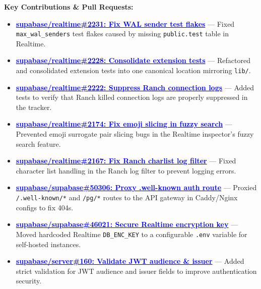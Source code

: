 \documentclass[letterpaper,10pt]{article}
\begin{document}
\vspace{4pt}
\noindent\textbf{Key Contributions \& Pull Requests:}
\begin{itemize}
  \item \href{https://github.com/supabase/realtime/pull/2231}{\textcolor{blue}{\textbf{supabase/realtime\#2231: Fix WAL sender test flakes}}} --- Fixed \texttt{max\_wal\_senders} test flakes caused by missing \texttt{public.test} table in Realtime.
  \item \href{https://github.com/supabase/realtime/pull/2228}{\textcolor{blue}{\textbf{supabase/realtime\#2228: Consolidate extension tests}}} --- Refactored and consolidated extension tests into one canonical location mirroring \texttt{lib/}.
  \item \href{https://github.com/supabase/realtime/pull/2222}{\textcolor{blue}{\textbf{supabase/realtime\#2222: Suppress Ranch connection logs}}} --- Added tests to verify that Ranch killed connection logs are properly suppressed in the tracker.
  \item \href{https://github.com/supabase/realtime/pull/2174}{\textcolor{blue}{\textbf{supabase/realtime\#2174: Fix emoji slicing in fuzzy search}}} --- Prevented emoji surrogate pair slicing bugs in the Realtime inspector's fuzzy search feature.
  \item \href{https://github.com/supabase/realtime/pull/2167}{\textcolor{blue}{\textbf{supabase/realtime\#2167: Fix Ranch charlist log filter}}} --- Fixed character list handling in the Ranch log filter to prevent logging errors.
  \item \href{https://github.com/supabase/supabase/pull/50306}{\textcolor{blue}{\textbf{supabase/supabase\#50306: Proxy .well-known auth route}}} --- Proxied \texttt{/.well-known/*} and \texttt{/pg/*} routes to the API gateway in Caddy/Nginx configs to fix 404s.
  \item \href{https://github.com/supabase/supabase/pull/46021}{\textcolor{blue}{\textbf{supabase/supabase\#46021: Secure Realtime encryption key}}} --- Moved hardcoded Realtime \texttt{DB\_ENC\_KEY} to a configurable \texttt{.env} variable for self-hosted instances.
  \item \href{https://github.com/supabase/server/pull/160}{\textcolor{blue}{\textbf{supabase/server\#160: Validate JWT audience \& issuer}}} --- Added strict validation for JWT audience and issuer fields to improve authentication security.
\end{itemize}

\vspace{4pt}
\end{document}
